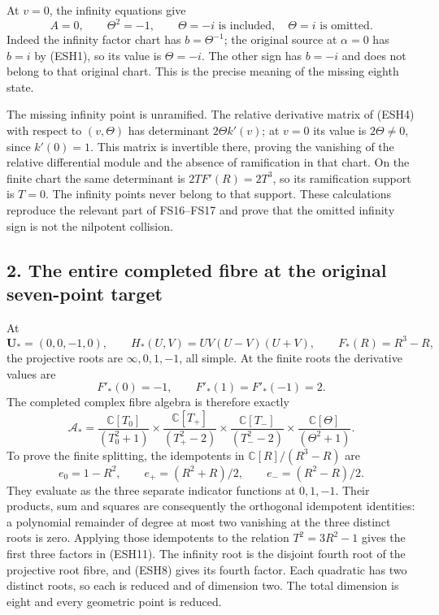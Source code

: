 \documentclass[
  10pt,
  a4paper,
]{article}
\begin{document}
At \(v=0\), the infinity equations give \[
A=0,\qquad \Theta^2=-1,\qquad
\Theta=-i\text{ is included},\quad \Theta=i\text{ is omitted}.
\tag{ESH8}
\] Indeed the infinity factor chart has \(b=\Theta^{-1}\); the original
source at \(\alpha=0\) has \(b=i\) by (ESH1), so its value is
\(\Theta=-i\). The other sign has \(b=-i\) and does not belong to that
original chart. This is the precise meaning of the missing eighth state.

The missing infinity point is unramified. The relative derivative matrix
of (ESH4) with respect to \((v,\Theta)\) has determinant
\(2\Theta k'(v)\); at \(v=0\) its value is \(2\Theta\ne0\), since
\(k'(0)=1\). This matrix is invertible there, proving the vanishing of
the relative differential module and the absence of ramification in that
chart. On the finite chart the same determinant is \(2T F'(R)=2T^3\), so
its ramification support is \(T=0\). The infinity points never belong to
that support. These calculations reproduce the relevant part of
FS16--FS17 and prove that the omitted infinity sign is not the nilpotent
collision.

\subsection{2. The entire completed fibre at the original seven-point
target}\label{the-entire-completed-fibre-at-the-original-seven-point-target}

At \[
\mathbf U_*=(0,0,-1,0),\qquad
H_*(U,V)=UV(U-V)(U+V),\qquad F_*(R)=R^3-R,
\tag{ESH9}
\] the projective roots are \(\infty,0,1,-1\), all simple. At the finite
roots the derivative values are \[
F'_*(0)=-1,\qquad F'_*(1)=F'_*(-1)=2.
\tag{ESH10}
\] The completed complex fibre algebra is therefore exactly \[
\mathcal A_*=
\frac{\mathbb C[T_0]}{(T_0^2+1)}
\times\frac{\mathbb C[T_+]}{(T_+^2-2)}
\times\frac{\mathbb C[T_-]}{(T_-^2-2)}
\times\frac{\mathbb C[\Theta]}{(\Theta^2+1)}.
\tag{ESH11}
\] To prove the finite splitting, the idempotents in
\(\mathbb C[R]/(R^3-R)\) are \[
e_0=1-R^2,\qquad e_+=(R^2+R)/2,\qquad e_-=(R^2-R)/2.
\tag{ESH12}
\] They evaluate as the three separate indicator functions at
\(0,1,-1\). Their products, sum and squares are consequently the
orthogonal idempotent identities: a polynomial remainder of degree at
most two vanishing at the three distinct roots is zero. Applying those
idempotents to the relation \(T^2=3R^2-1\) gives the first three factors
in (ESH11). The infinity root is the disjoint fourth root of the
projective root fibre, and (ESH8) gives its fourth factor. Each
quadratic has two distinct roots, so each is reduced and of dimension
two. The total dimension is eight and every geometric point is reduced.
\end{document}
